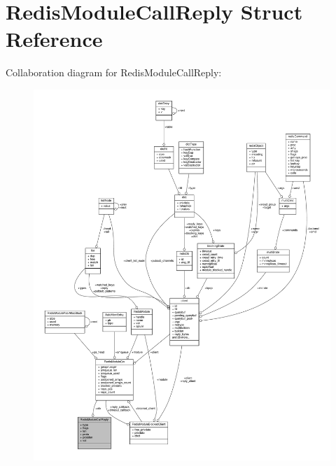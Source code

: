 \hypertarget{structRedisModuleCallReply}{}\section{Redis\+Module\+Call\+Reply Struct Reference}
\label{structRedisModuleCallReply}


Collaboration diagram for Redis\+Module\+Call\+Reply\+:\nopagebreak
\begin{figure}[H]
\begin{center}
\leavevmode
\includegraphics[width=350pt]{structRedisModuleCallReply__coll__graph}
\end{center}
\end{figure}
